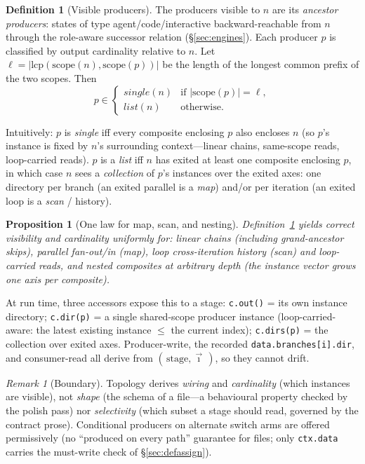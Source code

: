 \documentclass[11pt]{article}
\theoremstyle{plain}
\newtheorem{proposition}[theorem]{Proposition}
\theoremstyle{definition}
\newtheorem{definition}[theorem]{Definition}
\theoremstyle{remark}
\newtheorem{remark}[theorem]{Remark}
\newcommand{\code}[1]{\texttt{#1}}
\newcommand{\state}[1]{\textsf{#1}}
\begin{document}
\begin{definition}[Visible producers]\label{def:visible}
The producers visible to $n$ are its \emph{ancestor producers}: states of type
\state{agent}/\state{code}/\state{interactive} backward-reachable from $n$ through
the role-aware successor relation (\S\ref{sec:engines}). Each producer $p$ is
classified by output cardinality relative to $n$. Let $\ell =
|\mathrm{lcp}(\mathrm{scope}(n),\mathrm{scope}(p))|$ be the length of the longest
common prefix of the two scopes. Then
\[
  p \in
  \begin{cases}
    \mathit{single}(n) & \text{if } |\mathrm{scope}(p)| = \ell, \\[2pt]
    \mathit{list}(n)   & \text{otherwise.}
  \end{cases}
\]
\end{definition}

Intuitively: $p$ is \emph{single} iff every composite enclosing $p$ also encloses
$n$ (so $p$'s instance is fixed by $n$'s surrounding context---linear chains,
same-scope reads, loop-carried reads). $p$ is a \emph{list} iff $n$ has exited at
least one composite enclosing $p$, in which case $n$ sees a \emph{collection} of
$p$'s instances over the exited axes: one directory per branch (an exited
\state{parallel} is a \emph{map}) and/or per iteration (an exited \state{loop} is a
\emph{scan} / history).

\begin{proposition}[One law for map, scan, and nesting]
Definition~\ref{def:visible} yields correct visibility and cardinality uniformly
for: linear chains (including grand-ancestor skips), \state{parallel} fan-out/in
(map), \state{loop} cross-iteration history (scan) and loop-carried reads, and
nested composites at arbitrary depth (the instance vector grows one axis per
composite).
\end{proposition}

At run time, three accessors expose this to a stage:
\code{c.out()} = its own instance directory; \code{c.dir(p)} = a single
shared-scope producer instance (loop-carried-aware: the latest existing instance
$\le$ the current index); \code{c.dirs(p)} = the collection over exited axes.
Producer-write, the recorded \code{data.branches[i].dir}, and consumer-read all
derive from $(\,\text{stage}, \vec{\imath}\,)$, so they cannot drift.

\begin{remark}[Boundary]
Topology derives \emph{wiring} and \emph{cardinality} (which instances are
visible), not \emph{shape} (the schema of a file---a behavioural property checked by
the \state{polish} pass) nor \emph{selectivity} (which subset a stage should read,
governed by the contract prose). Conditional producers on alternate \state{switch}
arms are offered permissively (no ``produced on every path'' guarantee for files;
only \code{ctx.data} carries the must-write check of \S\ref{sec:defassign}).
\end{remark}
\end{document}
